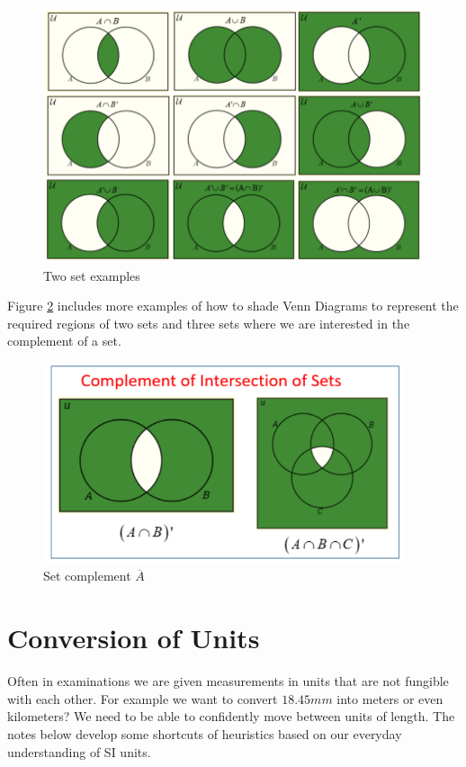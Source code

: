 \begin{figure}[h]
    \centering
    \includegraphics[width=1.25\textwidth]{set1}
    \caption{Two set examples}
    \label{fig:example1}
\end{figure}

Figure \ref{fig:example0} includes more examples of how to shade Venn Diagrams to represent the required regions of two sets and three sets where we are interested in the complement of a set.

\begin{figure}[h]
    \centering
    \includegraphics[width=0.95\textwidth]{set0}
    \caption{Set complement $\overline{A}$}
    \label{fig:example0}
\end{figure}

\section{Conversion of Units}

Often in examinations we are given measurements in units that are not fungible with each other. For example we want to convert $18.45 mm$ into meters or even kilometers?  We need to be able to confidently move between units of length. The notes below develop some shortcuts of heuristics based on our everyday understanding of SI units.

